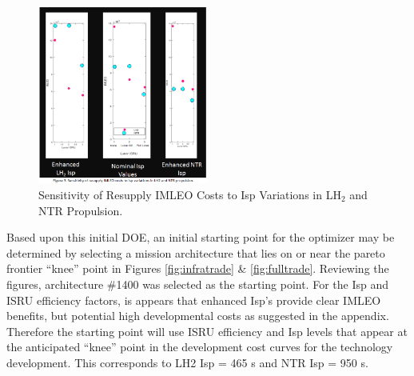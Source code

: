 \documentclass[]{aiaa-pretty}
\begin{document}
\begin{figure}[ht!]
	\centering
	\includegraphics[width=0.5\textwidth]{improvetrade}
	\caption{Sensitivity of Resupply IMLEO Costs to Isp Variations in LH$_2$ and NTR Propulsion.}
	\label{fig:senstrade}
\end{figure}

Based upon this initial DOE, an initial starting point for the optimizer may be determined by selecting a mission architecture that lies on or near the pareto frontier “knee” point in Figures \ref{fig:infratrade} \& \ref{fig:fulltrade}. Reviewing the figures, architecture \#1400 was selected as the starting point. For the Isp and ISRU efficiency factors, is appears that enhanced Isp’s provide clear IMLEO benefits, but potential high developmental costs as suggested in the appendix. Therefore the starting point will use ISRU efficiency and Isp levels that appear at the anticipated “knee” point in the development cost curves for the technology development. This corresponds to LH2 Isp = 465 s and NTR Isp = 950 s.
\end{document}
